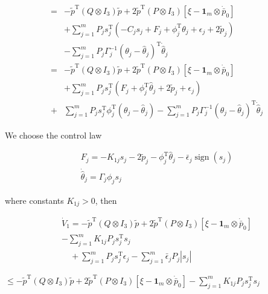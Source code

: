 \documentclass[10pt]{article}
\begin{document}
$$
\begin{aligned}
= & -\tilde{p}^{\mathrm{T}}\left(Q \otimes I_{3}\right) \tilde{p}+2 \tilde{p}^{\mathrm{T}}\left(P \otimes I_{3}\right)\left[\xi-\mathbf{1}_{m} \otimes \dot{\bar{p}}_{0}\right] \\
& +\sum_{j=1}^{m} P_{j} s_{j}^{\mathrm{T}}\left(-C_{j} s_{j}+F_{j}+\phi_{j}^{\mathrm{T}} \theta_{j}+\epsilon_{j}+2 \tilde{p}_{j}\right) \\
& -\sum_{j=1}^{m} P_{j} \Gamma_{j}^{-1}\left(\theta_{j}-\hat{\theta}_{j}\right)^{\mathrm{T}} \dot{\hat{\theta}}_{j} \\
= & -\tilde{p}^{\mathrm{T}}\left(Q \otimes I_{3}\right) \tilde{p}+2 \tilde{p}^{\mathrm{T}}\left(P \otimes I_{3}\right)\left[\xi-\mathbf{1}_{m} \otimes \dot{\bar{p}}_{0}\right] \\
& +\sum_{j=1}^{m} P_{j} s_{j}^{\mathrm{T}}\left(F_{j}+\phi_{j}^{\mathrm{T}} \hat{\theta}_{j}+2 \tilde{p}_{j}+\epsilon_{j}\right) \\
+ & \sum_{j=1}^{m} P_{j} s_{j}^{\mathrm{T}} \phi_{j}^{\mathrm{T}}\left(\theta_{j}-\hat{\theta}_{j}\right)-\sum_{j=1}^{m} P_{j} \Gamma_{j}^{-1}\left(\theta_{j}-\hat{\theta}_{j}\right)^{\mathrm{T}} \dot{\hat{\theta}}_{j}
\end{aligned}
$$

We choose the control law

$$
\begin{gathered}
F_{j}=-K_{1 j} s_{j}-2 \tilde{p}_{j}-\phi_{j}^{\mathrm{T}} \hat{\theta}_{j}-\bar{\epsilon}_{j} \operatorname{sign}\left(s_{j}\right) \\
\dot{\hat{\theta}}_{j}=\Gamma_{j} \phi_{j} s_{j}
\end{gathered}
$$

where constants $K_{1 j}>0$, then

$$
\begin{gathered}
\dot{V}_{1}=-\tilde{p}^{\mathrm{T}}\left(Q \otimes I_{3}\right) \tilde{p}+2 \tilde{p}^{\mathrm{T}}\left(P \otimes I_{3}\right)\left[\xi-\mathbf{1}_{m} \otimes \dot{\bar{p}}_{0}\right] \\
-\sum_{j=1}^{m} K_{1 j} P_{j} s_{j}^{\mathrm{T}} s_{j} \\
\quad+\sum_{j=1}^{m} P_{j} s_{j}^{\mathrm{T}} \epsilon_{j}-\sum_{j=1}^{m} \bar{\epsilon}_{j} P_{j}\left|s_{j}\right|
\end{gathered}
$$

$\leq-\tilde{p}^{\mathrm{T}}\left(Q \otimes I_{3}\right) \tilde{p}+2 \tilde{p}^{\mathrm{T}}\left(P \otimes I_{3}\right)\left[\xi-\mathbf{1}_{m} \otimes \dot{\bar{p}}_{0}\right]-\sum_{j=1}^{m} K_{1 j} P_{j} s_{j}^{\mathrm{T}} s_{j}$
\end{document}
